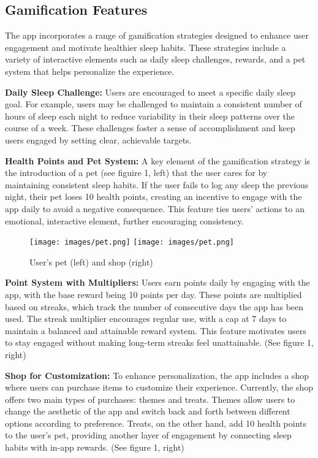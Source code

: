 \documentclass[10pt,twocolumn]{article}
\begin{document}
\subsection{Gamification Features}

 The app incorporates a range of gamification strategies designed to enhance user engagement and motivate healthier sleep habits. These strategies include a variety of interactive elements such as daily sleep challenges, rewards, and a pet system that helps personalize the experience.

\textbf{Daily Sleep Challenge:} Users are encouraged to meet a specific daily sleep goal. For example, users may be challenged to maintain a consistent number of hours of sleep each night to reduce variability in their sleep patterns over the course of a week. These challenges foster a sense of accomplishment and keep users engaged by setting clear, achievable targets.

\textbf{Health Points and Pet System:} A key element of the gamification strategy is the introduction of a pet (see figuire 1, left) that the user cares for by maintaining consistent sleep habits. If the user fails to log any sleep the previous night, their pet loses 10 health points, creating an incentive to engage with the app daily to avoid a negative consequence. This feature ties users' actions to an emotional, interactive element, further encouraging consistency.

\begin{figure}[htbp]
    \centering
    \texttt{[image: images/pet.png]}
    \texttt{[image: images/pet.png]}
    \caption{User's pet (left) and shop (right)}
    \label{fig:pet}
\end{figure}


\textbf{Point System with Multipliers:} Users earn points daily by engaging with the app, with the base reward being 10 points per day. These points are multiplied based on streaks, which track the number of consecutive days the app has been used. The streak multiplier encourages regular use, with a cap at 7 days to maintain a balanced and attainable reward system. This feature motivates users to stay engaged without making long-term streaks feel unattainable. (See figure 1, right)

\textbf{Shop for Customization:} To enhance personalization, the app includes a shop where users can purchase items to customize their experience. Currently, the shop offers two main types of purchases: themes and treats. Themes allow users to change the aesthetic of the app and switch back and forth between different options according to preference. Treats, on the other hand, add 10 health points to the user’s pet, providing another layer of engagement by connecting sleep habits with in-app rewards. (See figure 1, right)
\end{document}
